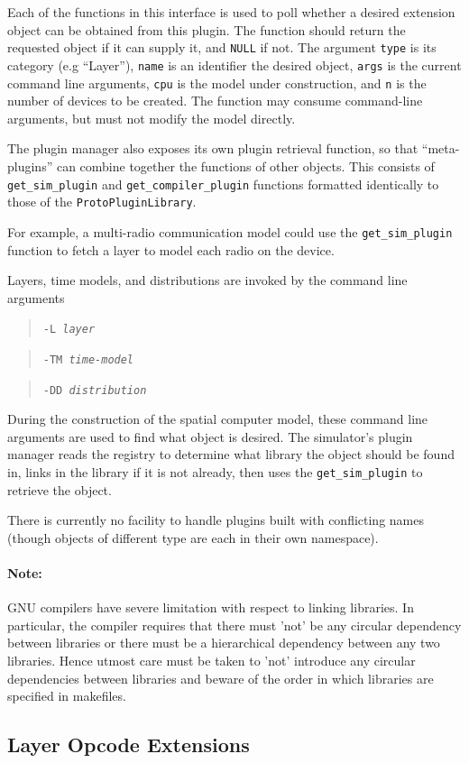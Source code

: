\documentclass{article}
\newcommand\code[1]{\begin{quote}\var{#1}\end{quote}}
\newcommand\var[1]{{\tt #1}}
\begin{document}
Each of the functions in this interface is used to poll whether a
desired extension object can be obtained from this plugin.  The
function should return the requested object if it can supply it, and
\var{NULL} if not.  The argument \var{type} is its category (e.g
``Layer''), \var{name} is an identifier the desired object, \var{args}
is the current command line arguments, \var{cpu} is the model under
construction, and \var{n} is the number of devices to be created.  The
function may consume command-line arguments, but must not modify the
model directly.

The plugin manager also exposes its own plugin retrieval function, so
that ``meta-plugins'' can combine together the functions of other
objects.  This consists of \var{get\_sim\_plugin} and
\var{get\_compiler\_plugin} functions formatted identically to those
of the \var{ProtoPluginLibrary}.

For example, a multi-radio communication model could use the
\var{get\_sim\_plugin} function to fetch a layer to model each radio
on the device.

Layers, time models, and distributions are invoked by the command line
arguments \code{-L {\it layer}} \code{-TM {\it time-model}} \code{-DD
  {\it distribution}}  

During the construction of the spatial computer model, these command
line arguments are used to find what object is desired.  The
simulator's plugin manager reads the registry to determine what
library the object should be found in, links in the library if it is
not already, then uses the \var{get\_sim\_plugin} to retrieve the
object.

There is currently no facility to handle plugins built with
conflicting names (though objects of different type are each in their
own namespace).

\paragraph{Note:}
GNU compilers have severe limitation with respect to linking
libraries.  In particular, the compiler requires that there must 'not'
be any circular dependency between libraries or there must be a
hierarchical dependency between any two libraries.  Hence utmost care
must be taken to 'not' introduce any circular dependencies between
libraries and beware of the order in which libraries are specified in
makefiles.

\subsection{Layer Opcode Extensions}
\end{document}
